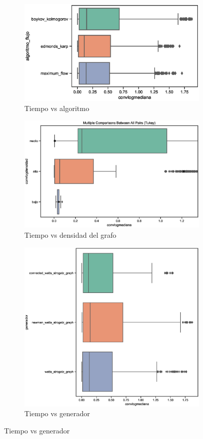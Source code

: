 \documentclass{article}
\begin{document}
\begin{figure}[h]

\begin{subfigure}{0.5\textwidth}
\includegraphics[width=0.9\linewidth]{Imagenes/aboxplotalgoritmoflujo.eps} 
\caption{Tiempo vs algoritmo}
\end{subfigure}

\begin{subfigure}{0.5\textwidth}
\includegraphics[width=0.9\linewidth]{Imagenes/aboxplotconvlogdensidad.eps}
\caption{Tiempo vs densidad del grafo}
\end{subfigure}

\begin{subfigure}{0.5\textwidth}
\includegraphics[width=0.9\linewidth]{Imagenes/aboxplotgenerador.eps}
\caption{Tiempo vs generador}
\end{subfigure}


\end{figure}
\end{document}
